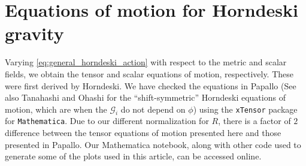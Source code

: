 \documentclass{ws-ijmpd}
\begin{document}
\section{Equations of motion for Horndeski gravity
   \label{sec:eom_horndeski_gravity}
}
Varying \eqref{eq:general_horndeski_action} 
with respect to the metric and scalar fields, 
we obtain the tensor and scalar equations of motion,
respectively. These were first derived by Horndeski\cite{horndeski_paper}.
We have checked the equations in Papallo\cite{Papallo:2017ddx}
(See also Tanahashi and Ohashi\cite{Tanahashi:2017kgn}
for the ``shift-symmetric'' Horndeski equations of motion, which are
when the $\mathcal{G}_i$ do not depend on $\phi$)
using the \texttt{xTensor}\cite{xAct,martin2008xperm,Brizuela:2008ra} 
package for \texttt{Mathematica}.
Due to our different normalization for $R$, there is a
factor of $2$ difference between the tensor equations of motion
presented here and those presented in Papallo\cite{Papallo:2017ddx}.
Our Mathematica notebook, along with other code used to generate
some of the plots used in this article,
can be accessed online\cite{github_article}.
\end{document}
